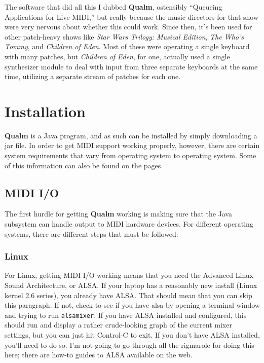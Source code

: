 \documentclass{article}
\newcommand{\q}{{\textsf{\textbf{Qualm}}}\xspace}
\newcommand{\code}[1]{{\tt #1}}
\begin{document}
The software that did all this I dubbed \q, ostensibly ``Queueing
Applications for Live MIDI,'' but really because the music directors
for that show were very nervous about whether this could work.  Since
then, it's been used for other patch-heavy shows like {\em Star Wars
  Trilogy: Musical Edition}, {\em The Who's Tommy}, and {\em Children
  of Eden}.  Most of these were operating a single keyboard with many
patches, but {\em Children of Eden}, for one, actually used a single
synthesizer module to deal with input from three separate keyboards at
the same time, utilizing a separate stream of patches for each one.

\section{Installation}

\q is a Java program, and as such can be installed by simply
downloading a jar file.  In order to get MIDI support working
properly, however, there are certain system requirements that vary
from operating system to operating system.  Some of this information
can also be found on the  pages.

\subsection{MIDI I/O}

The first hurdle for getting \q working is making sure that the Java
subsystem can handle output to MIDI hardware devices.  For different
operating systems, there are different steps that must be followed:

\subsubsection{Linux}

For Linux, getting MIDI I/O working means that you need the Advanced
Linux Sound Architecture, or ALSA.  If your laptop has a reasonably
new install (Linux kernel 2.6 series), you already have ALSA.  That
should mean that you can skip this paragraph.  If not, check to see if
you have alsa by opening a terminal window and trying to run
\code{alsamixer}.  If you have ALSA installed and configured, this
should run and display a rather crude-looking graph of the current
mixer settings, but you can just hit Control-C to exit.  If you don't
have ALSA installed, you'll need to do so.  I'm not going to go
through all the rigmarole for doing this here; there are how-to guides
to ALSA available on the web.
\end{document}
